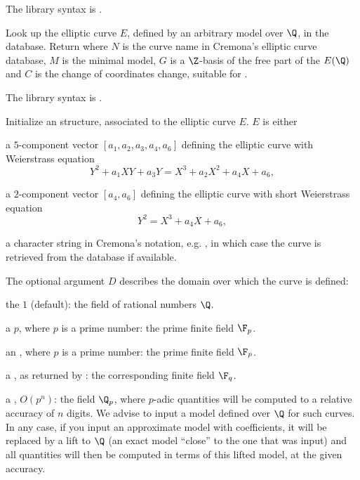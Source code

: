 The library syntax is .

\label{se:ellidentify}
Look up the elliptic curve $E$, defined by an arbitrary model over $\Q$,
in the  database.
Return \kbd{[[N, M, G], C]}  where $N$ is the curve name in Cremona's
elliptic curve database, $M$ is the minimal model, $G$ is a $\Z$-basis of
the free part of the  $E(\Q)$ and $C$ is the
change of coordinates change, suitable for .

The library syntax is .

\label{se:ellinit}
Initialize an  structure, associated to the elliptic curve $E$.
$E$ is either

\item a $5$-component vector $[a_1,a_2,a_3,a_4,a_6]$ defining the elliptic
curve with Weierstrass equation
$$ Y^2 + a_1 XY + a_3 Y = X^3 + a_2 X^2 + a_4 X + a_6, $$

\item a $2$-component vector $[a_4,a_6]$ defining the elliptic
curve with short Weierstrass equation
$$ Y^2 = X^3 + a_4 X + a_6, $$

\item a character string in Cremona's notation, e.g. , in which
case the curve is retrieved from the  database if available.

The optional argument $D$ describes the domain over which the curve is
defined:

\item the  $1$ (default): the field of rational numbers $\Q$.

\item a  $p$, where $p$ is a prime number: the prime finite field
$\F_p$.

\item an  , where $p$ is a prime number: the
prime finite field $\F_p$.

\item a , as returned by : the corresponding finite
field $\F_q$.

\item a , $O(p^n)$: the field $\Q_p$, where $p$-adic quantities
will be computed to a relative accuracy of $n$ digits. We advise to input a
model defined over $\Q$ for such curves. In any case, if you input an
approximate model with  coefficients, it will be replaced by a lift
to $\Q$ (an exact model ``close'' to the one that was input) and all quantities
will then be computed in terms of this lifted model, at the given accuracy.

